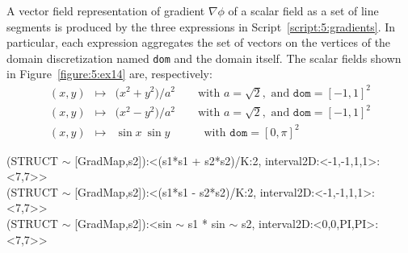 \documentclass{31x47jw}
\begin{document}
\begin{example}
    
% 

A vector field representation of gradient $\nabla \phi$ of a scalar field
as a set of line segments is produced by the three expressions in
Script~\ref{script:5:gradients}.  In particular, each expression
aggregates the set of vectors on the vertices of the domain
discretization named \texttt{dom} and the domain itself.  The scalar
fields shown in Figure~\ref{figure:5:ex14} are, respectively:
\begin{eqnarray*}
(x,y) &\mapsto& {({x^{2} + y^{2})}/ a^{2}} 
\qquad \mbox{with\ } a =\sqrt 2, \mbox{\ and\ } \texttt{dom} = [-1,1]^{2}
\\
(x,y) &\mapsto& {({x^{2} - y^{2})}/ a^{2}}
\qquad \mbox{with\ } a =\sqrt 2, \mbox{\ and\ } \texttt{dom} = [-1,1]^{2}
\\
(x,y) &\mapsto& {\sin x \ \sin y}
\qquad \mbox{~~~with\ }  \texttt{dom} = [0,\pi]^{2}
\end{eqnarray*}

    
\begin{script}
\begin{smallplasm} 
(STRUCT $\sim$ [GradMap,s2]):<(s1*s1 + s2*s2)/K:2, interval2D:<-1,-1,1,1>:<7,7>>\\
(STRUCT $\sim$ [GradMap,s2]):<(s1*s1 - s2*s2)/K:2, interval2D:<-1,-1,1,1>:<7,7>>\\
(STRUCT $\sim$ [GradMap,s2]):<sin $\sim$ s1 * sin $\sim$ s2, interval2D:<0,0,PI,PI>:<7,7>>
\end{smallplasm} 
\label{script:5:gradients}
\end{script}


\end{example}
\end{document}
